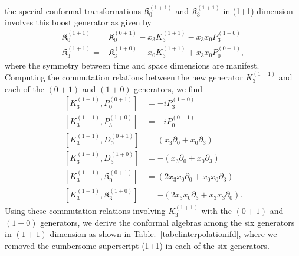 \documentclass[%
 reprint,
superscriptaddress,
 amsmath,amssymb,
 aps,
]{revtex4-2}
\begin{document}
the special conformal transformations $\mathfrak{K}^{(1+1)}_{{0}}$
and $\mathfrak{K}^{(1+1)}_{{3}}$ in (1+1) dimension involves this boost generator as given by
\begin{align}
\mathfrak{K}^{(1+1)}_{{0}}=&\mathfrak{K}^{(0+1)}_{{0}}-x_{3}K_{3}^{(1+1)}-x_{3}x_{0}P^{(1+0)}_{3}\\
\mathfrak{K}^{(1+1)}_{{3}}=&\mathfrak{K}^{(1+0)}_{{3}}-x_{0}K_{3}^{(1+1)}+x_{3}x_{0}P^{(0+1)}_{0},
\end{align}
where the symmetry between time and space 
dimensions are manifest.
Computing the commutation relations between the new generator $K_{3}^{(1+1)}$ and each of the $(0+1)$ and $(1+0)$ generators, we find
\begin{align}
    \left[K_{3}^{(1+1)}, P^{(0+1)}_{0}\right] &= -iP^{(1+0)}_{3}\\
    \left[K_{3}^{(1+1)}, P^{(1+0)}_{3}\right] &= -iP^{(0+1)}_{0}\\
    \left[K_{3}^{(1+1)}, D^{(0+1)}_{0}\right] &=(x_{3}\partial_{0}+x_{0}\partial_{3})\\
    \left[K_{3}^{(1+1)}, D^{(1+0)}_{3}\right] &=-(x_{3}\partial_{0}+x_{0}\partial_{3})\\
    \left[K_{3}^{(1+1)}, \mathfrak{K}^{(0+1)}_{0}\right] &=(2x_{3}x_{0}\partial_{0}+x_{0}x_{0}\partial_{3})\\
    \left[K_{3}^{(1+1)}, \mathfrak{K}^{(1+0)}_{3}\right] &=-(2x_{3}x_{0}\partial_{3}+x_{3}x_{3}\partial_{0}).
\end{align}
Using these commutation relations involving $K_{3}^{(1+1)}$ with the $(0+1)$ and $(1+0)$ generators, we derive the conformal algebras among the six generators in $(1+1)$ dimension as shown in Table.~\ref{tabelinterpolationifd}, where we removed the cumbersome superscript (1+1) in each of the six generators. 
\end{document}
